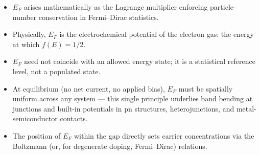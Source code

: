 \documentclass[11pt]{article}
\begin{document}
\begin{itemize}
\item $E_F$ arises mathematically as the Lagrange multiplier enforcing particle-number conservation in Fermi--Dirac statistics.
\item Physically, $E_F$ is the electrochemical potential of the electron gas: the energy at which $f(E) = 1/2$.
\item $E_F$ need not coincide with an allowed energy state; it is a statistical reference level, not a populated state.
\item At equilibrium (no net current, no applied bias), $E_F$ must be spatially uniform across any system — this single principle underlies band bending at junctions and built-in potentials in pn structures, heterojunctions, and metal-semiconductor contacts.
\item The position of $E_F$ within the gap directly sets carrier concentrations via the Boltzmann (or, for degenerate doping, Fermi--Dirac) relations.
\end{itemize}
\end{document}
